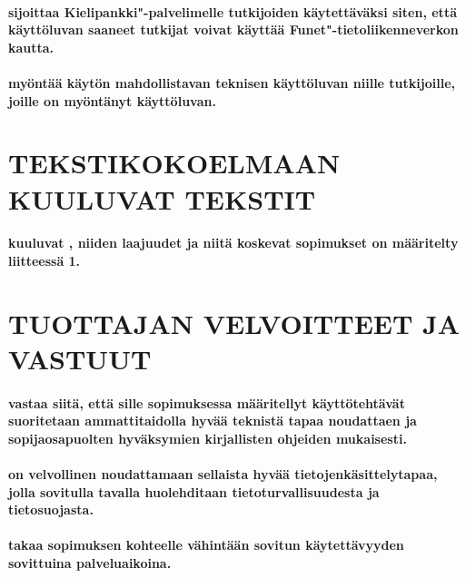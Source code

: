 \documentclass[a4paper,finnish]{article}
\begin{document}
\paragraph{ sijoittaa 
Kielipankki"-palvelimelle tutkijoiden käytettäväksi siten, että
 käyttöluvan saaneet tutkijat voivat käyttää
 Funet"-tietoliikenneverkon kautta.}

\paragraph{ myöntää  käytön
mahdollistavan teknisen käyttöluvan niille tutkijoille, joille
 on myöntänyt  käyttöluvan.}

\section{TEKSTIKOKOELMAAN KUULUVAT TEKSTIT}

\paragraph{ kuuluvat , niiden
laajuudet ja niitä koskevat sopimukset on määritelty liitteessä 1.}

\section{TUOTTAJAN VELVOITTEET JA VASTUUT}

\paragraph{ vastaa siitä, että sille sopimuksessa
määritellyt käyttötehtävät suoritetaan ammattitaidolla hyvää teknistä
tapaa noudattaen ja sopijaosapuolten hyväksymien kirjallisten ohjeiden
mukaisesti.}

\paragraph{ on velvollinen noudattamaan sellaista
hyvää tietojenkäsittelytapaa, jolla sovitulla tavalla huolehditaan
tietoturvallisuudesta ja tietosuojasta.}

\paragraph{ takaa sopimuksen kohteelle vähintään sovitun
käytettävyyden sovittuina palveluaikoina.}
\end{document}
